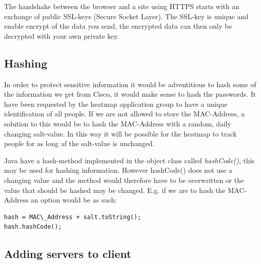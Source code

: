 The handshake between the browser and a site using HTTPS starts with an exchange of public SSL-keys (Secure Socket Layer). The SSL-key is unique and enable encrypt of the data you send, the encrypted data can then only be decrypted with your own private key\cite{HTTPS}. 

\subsection*{Hashing}
In order to protect sensitive information it would be adventitious to hash some of the information we get from Cisco, it would make sense to hash the passwords. 
It have been requested by the heatmap application group to have a unique identification of all people. If we are not allowed to store the MAC-Address, a solution to this would be to hash the MAC-Address with a random, daily changing salt-value. In this way it will be possible for the heatmap to track people for as long af the salt-value is unchanged.

Java have a hash-method implemented in the object class called \textit{hashCode()}, this may be used for hashing information. However hashCode() does not use a changing value and the method would therefore have to be overwritten or the value that should be hashed may be changed. E.g. if we are to hash the MAC-Address an option would be as such:
\begin{lstlisting}[caption={Hash a MAC-Address},label={lst:hash},language=inc_Java]
hash = MAC\_Address + salt.toString();
hash.hashCode();
\end{lstlisting}





\subsection*{Adding servers to client}
